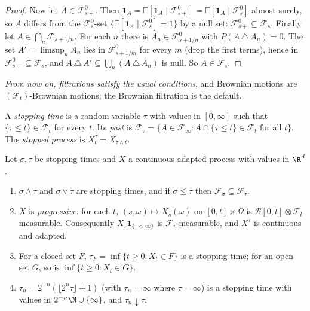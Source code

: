 \begin{proof}
Now let $A\in\mathcal F^0_{s+}$. Then $\mathbf 1_A=\mathbb E[\mathbf 1_A\mid\mathcal F^0_{s+}]=\mathbb E[\mathbf 1_A\mid\mathcal F^0_s]$ almost surely, so $A$ differs from the $\mathcal F^0_s$-set $\{\mathbb E[\mathbf 1_A\mid\mathcal F^0_s]=1\}$ by a null set:
$\mathcal F^0_{s+}\subseteq\mathcal F_s$. Finally let $A\in\bigcap_{n}\mathcal F_{s+1/n}$. For each $n$ there is $A_n\in\mathcal F^0_{s+1/n}$ with $P(A\,\triangle\,A_n)=0$. The set $A'=\limsup_nA_n$ lies in
$\mathcal F^0_{s+1/m}$ for every $m$ (drop the first terms), hence in $\mathcal F^0_{s+}\subseteq\mathcal F_s$, and $A\,\triangle\,A'\subseteq\bigcup_n(A\,\triangle\,A_n)$ is null. So $A\in\mathcal F_s$.
\end{proof}

\emph{From now on, filtrations satisfy the usual conditions}, and Brownian motions are $(\mathcal F_t)$-Brownian motions; the Brownian filtration is the default.

\begin{definition}\label{def:stoptime}
A \emph{stopping time} is a random variable $\tau$ with values in $[0,\infty]$ such that $\{\tau\le t\}\in\mathcal F_t$ for every $t$. Its \emph{past} is
$\mathcal F_\tau=\{A\in\mathcal F_\infty:A\cap\{\tau\le t\}\in\mathcal F_t\text{ for all }t\}$. The \emph{stopped process} is $X^\tau_t=X_{\tau\wedge t}$.
\end{definition}

\begin{lemma}\label{lem:stopping}
Let $\sigma,\tau$ be stopping times and $X$ a continuous adapted process with values in $\R^d$.
\begin{enumerate}[label=(\alph*)]
\item $\sigma\wedge\tau$ and $\sigma\vee\tau$ are stopping times, and if $\sigma\le\tau$ then $\mathcal F_\sigma\subseteq\mathcal F_\tau$.
\item $X$ is \emph{progressive}: for each $t$, $(s,\omega)\mapsto X_s(\omega)$ on $[0,t]\times\Omega$ is $\mathcal B[0,t]\otimes\mathcal F_t$-measurable. Consequently $X_\tau\mathbf 1_{\{\tau<\infty\}}$ is
$\mathcal F_\tau$-measurable, and $X^\tau$ is continuous and adapted.
\item For a closed set $F$, $\tau_F=\inf\{t\ge0:X_t\in F\}$ is a stopping time; for an open set $G$, so is $\inf\{t\ge0:X_t\in G\}$.
\item $\tau_n=2^{-n}(\lfloor2^n\tau\rfloor+1)$ (with $\tau_n=\infty$ where $\tau=\infty$) is a stopping time with values in $2^{-n}\N\cup\{\infty\}$, and $\tau_n\downarrow\tau$.
\end{enumerate}
\end{lemma}

